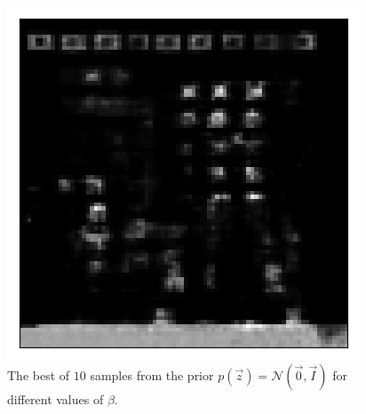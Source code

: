 \begin{figure}[h!]
\begin{multicols}{3}
    \includegraphics[scale=0.4]{figures/results/indiscriminate_decoupling/beta_4_prior_sample_3.png}
    \caption{$\beta=4$}
\end{multicols}
\caption{The best of $10$ samples from the prior $p(\vec{z}) = \mathcal{N}(\vec{0}, \vec{I})$ for different values of $\beta$.}
\label{fig:indiscriminate_decoupling_prior_samples}
\end{figure}


